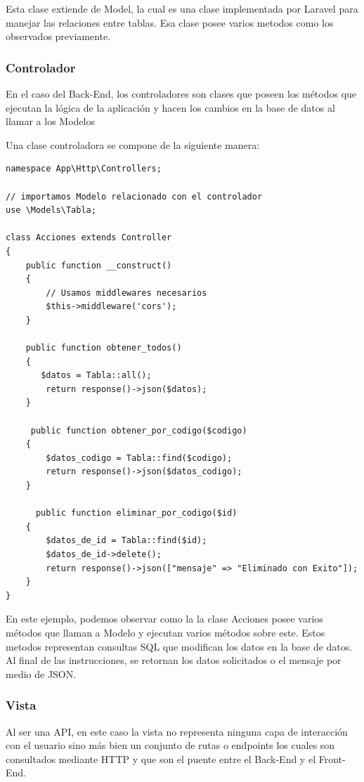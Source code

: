 Esta clase extiende de Model, la cual es una clase implementada por Laravel para manejar las relaciones entre tablas. Esa clase posee varios metodos como los observados previamente.

\subsubsection{Controlador}
En el caso del Back-End, los controladores son clases que poseen los métodos que ejecutan la lógica de la aplicación y hacen los cambios en la base de datos al llamar a los Modelos

Una clase controladora se compone de la siguiente manera:

\begin{lstlisting}
namespace App\Http\Controllers;

// importamos Modelo relacionado con el controlador
use \Models\Tabla;

class Acciones extends Controller
{
    public function __construct()
    {
        // Usamos middlewares necesarios
        $this->middleware('cors');
    }

    public function obtener_todos()
    {
       $datos = Tabla::all();
        return response()->json($datos);
    }
    
     public function obtener_por_codigo($codigo)
    {
        $datos_codigo = Tabla::find($codigo);
        return response()->json($datos_codigo);
    }
    
      public function eliminar_por_codigo($id)
    {
        $datos_de_id = Tabla::find($id);
        $datos_de_id->delete();
        return response()->json(["mensaje" => "Eliminado con Exito"]);
    }
}
\end{lstlisting}

En este ejemplo, podemos observar como la la clase Acciones posee varios métodos que llaman a Modelo y ejecutan varios métodos sobre este. Estos metodos representan consultas SQL que modifican los datos en la base de datos.
Al final de las instrucciones, se retornan los datos solicitados o el mensaje por medio de JSON.

\subsubsection{Vista}
Al ser una API, en este caso la vista no representa ninguna capa de interacción con el usuario sino más bien un conjunto de rutas o endpoints los cuales son consultados mediante HTTP y que son el puente entre el Back-End y el Front-End.

